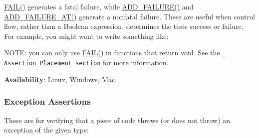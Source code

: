 {\ttfamily \mbox{\hyperlink{gtest_8h_a3e26a8d27caa386ed0ea7ce9d5b7c4ed}{F\+A\+I\+L()}}} generates a fatal failure, while {\ttfamily \mbox{\hyperlink{gtest_8h_adc16b5b0a740c39084ea5c9e960e3063}{A\+D\+D\+\_\+\+F\+A\+I\+L\+U\+R\+E()}}} and {\ttfamily \mbox{\hyperlink{gtest_8h_a448d7e5105b640e892fd8153fbee0b7f}{A\+D\+D\+\_\+\+F\+A\+I\+L\+U\+R\+E\+\_\+\+A\+T()}}} generate a nonfatal failure. These are useful when control flow, rather than a Boolean expression, determines the test\textquotesingle{}s success or failure. For example, you might want to write something like\+:


\begin{DoxyCode}{0}
\DoxyCodeLine{\}}
\end{DoxyCode}


N\+O\+TE\+: you can only use {\ttfamily \mbox{\hyperlink{gtest_8h_a3e26a8d27caa386ed0ea7ce9d5b7c4ed}{F\+A\+I\+L()}}} in functions that return {\ttfamily void}. See the \href{\#assertion-placement}{\texttt{ Assertion Placement section}} for more information.

{\bfseries{Availability}}\+: Linux, Windows, Mac.

\subsubsection*{Exception Assertions}

These are for verifying that a piece of code throws (or does not throw) an exception of the given type\+:

